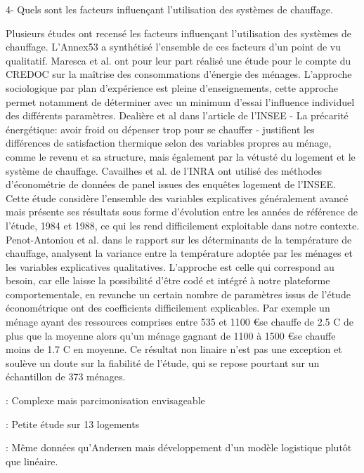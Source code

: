 4- Quels sont les facteurs influençant l'utilisation des systèmes de chauffage.

Plusieurs études ont recensé les facteurs influençant l'utilisation des systèmes de chauffage. L'Annex53 \cite{Annex-53-1} a synthétisé l'ensemble de ces facteurs d'un point de vu qualitatif. Maresca et al. \cite{Maresca-09} ont pour leur part réalisé une étude pour le compte du CREDOC sur la maîtrise des consommations d'énergie des ménages. L'approche sociologique par plan d'expérience est pleine d'enseignements, cette approche permet notamment de déterminer avec un minimum d'essai l'influence individuel des différents paramètres. Dealière et al \cite{Devaliere-11} dans l'article de l'INSEE - La précarité énergétique: avoir froid ou dépenser trop pour se chauffer - justifient les différences de satisfaction thermique selon des variables propres au ménage, comme le revenu et sa structure, mais également par la vétusté du logement et le système de chauffage. Cavailhes et al.\cite{Cavailhes-11} de l'INRA  ont utilisé des méthodes d'économétrie de données de panel issues des enquêtes logement de l'INSEE. Cette étude considère l'ensemble des variables explicatives généralement avancé mais présente ses résultats sous forme d'évolution entre les années de référence de l'étude, 1984 et 1988, ce qui les rend difficilement exploitable dans notre contexte. Penot-Antoniou et al. \cite{Penot-Antoniou-13} dans le rapport sur les déterminants de la température de chauffage, analysent la variance entre la température adoptée par les ménages et les variables explicatives qualitatives. L'approche est celle qui correspond au besoin, car elle laisse la possibilité d'être codé et intégré à notre plateforme comportementale, en revanche un certain nombre de paramètres issus de l'étude économétrique ont des coefficients difficilement explicables. Par exemple un ménage ayant des ressources comprises entre 535 et 1100 \euro se chauffe de 2.5 \degre C de plus que la moyenne alors qu'un ménage gagnant de 1100 à 1500 \euro se chauffe moins de 1.7 \degre C en moyenne. Ce résultat non linaire n'est pas une exception et soulève un doute sur la fiabilité de l'étude, qui se repose pourtant sur un échantillon de 373 ménages.

\cite{Kelly-13} : Complexe mais parcimonisation envisageable

\cite{Andersen-09} : Petite étude sur 13 logements

\cite{Fabi-13}: Même données qu'Andersen mais développement d'un modèle logistique plutôt que linéaire.


